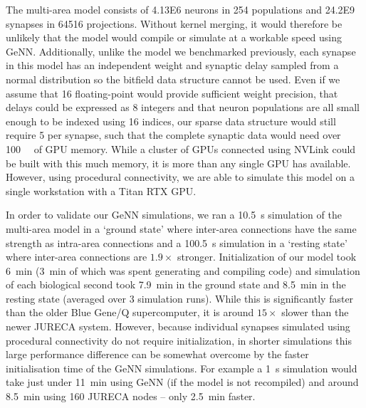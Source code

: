 \documentclass[9pt,a4paper]{amsart}
\begin{document}
The multi-area model consists of \num{4.13E6} neurons in \num{254} populations and \num{24.2E9} synapses in \num{64516} projections.
Without kernel merging, it would therefore be unlikely that the model would compile or simulate at a workable speed using GeNN.
Additionally, unlike the model we benchmarked previously, each synapse in this model has an independent weight and synaptic delay sampled from a normal distribution so the bitfield data structure cannot be used.
Even if we assume that \SI{16}{\bit} floating-point would provide sufficient weight precision, that delays could be expressed as \SI{8}{\bit} integers and that neuron populations are all small enough to be indexed using \SI{16}{\bit} indices, our sparse data structure would still require \SI{5}{\byte} per synapse, such that the complete synaptic data would need over \SI{100}{\giga\byte} of GPU memory.
While a cluster of GPUs connected using NVLink could be built with this much memory, it is more than any single GPU has available.
However, using procedural connectivity, we are able to simulate this model on a single workstation with a Titan RTX GPU.

In order to validate our GeNN simulations, we ran a \SI{10.5}{\second} simulation of the multi-area model in a `ground state' where inter-area connections have the same strength as intra-area connections and a \SI{100.5}{\second} simulation in a `resting state' where inter-area connections are $1.9\times$ stronger.
Initialization of our model took \SI{6}{\minute} (\SI{3}{\minute} of which was spent generating and compiling code) and simulation of each biological second took \SI{7.9}{\minute} in the ground state and \SI{8.5}{\minute} in the resting state (averaged over 3 simulation runs).
While this is significantly faster than the older Blue Gene/Q supercomputer, it is around $15\times$ slower than the newer JURECA system.
However, because individual synapses simulated using procedural connectivity do not require initialization, in shorter simulations this large performance difference can be somewhat overcome by the faster initialisation time of the GeNN simulations.
For example a \SI{1}{\second} simulation would take just under \SI{11}{\minute} using GeNN (if the model is not recompiled) and around \SI{8.5}{\minute} using \num{160} JURECA nodes -- only \SI{2.5}{\minute} faster.
\end{document}
